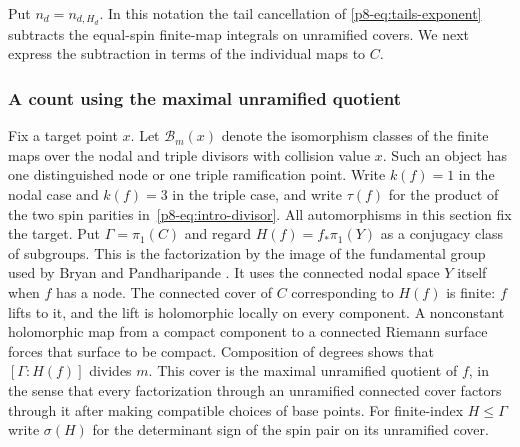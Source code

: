 Put $n_d=n_{d,H_d}$. In this notation the tail cancellation of
\eqref{p8-eq:tails-exponent} subtracts the equal-spin finite-map integrals
on unramified covers. We next express the subtraction in terms of
the individual maps to $C$.

\subsubsection{A count using the maximal unramified quotient}
Fix a target point $x$. Let $\mathcal B_m(x)$ denote the isomorphism
classes of the finite maps over the nodal and triple divisors with
collision value $x$. Such an object has one distinguished node or one
triple ramification point. Write $k(f)=1$ in the nodal case and
$k(f)=3$ in the triple case, and write $\tau(f)$ for the product of
the two spin parities in~\eqref{p8-eq:intro-divisor}. All automorphisms
in this section fix the target. Put $\Gamma=\pi_1(C)$ and regard
$H(f)=f_*\pi_1(Y)$ as a conjugacy class of subgroups. This is the factorization by the image of the fundamental group used
by Bryan and Pandharipande \cite[\S2.2, Proposition~2.3]{bp01}.
It uses
the connected nodal space $Y$ itself when $f$ has a node.
The connected cover of $C$ corresponding to $H(f)$ is finite:
$f$ lifts to it, and the lift is holomorphic locally on every
component. A nonconstant holomorphic map from a compact component
to a connected Riemann surface forces that surface to be compact.
Composition of degrees shows that $[\Gamma:H(f)]$ divides $m$.
This cover is the maximal unramified quotient of $f$, in the sense
that every factorization through an unramified connected cover
factors through it after making compatible choices of base points.
For finite-index $H\le\Gamma$ write $\sigma(H)$ for the determinant
sign of the spin pair on its unramified cover.

